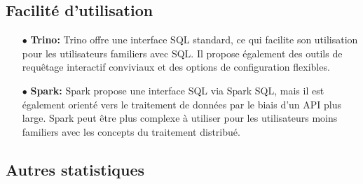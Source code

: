 \subsection{Facilité d'utilisation}
\begin{enumerate}
    \item[$\bullet$] \textbf{Trino:} Trino offre une interface SQL standard, ce qui facilite son utilisation pour les utilisateurs familiers avec SQL. Il propose également des outils de requêtage interactif conviviaux et des options de configuration flexibles.
    \item[$\bullet$] \textbf{Spark:} Spark propose une interface SQL via Spark SQL, mais il est également orienté vers le traitement de données par le biais d'un API plus large. Spark peut être plus complexe à utiliser pour les utilisateurs moins familiers avec les concepts du traitement distribué.
\end{enumerate}

\subsection{Autres statistiques}

